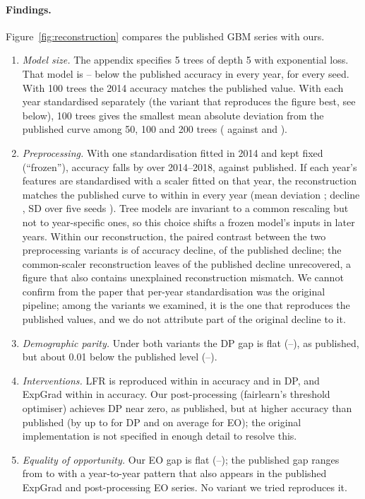 \documentclass[10pt]{article}
\begin{document}
\paragraph{Findings.}
Figure~\ref{fig:reconstruction} compares the published GBM series with ours.
\begin{enumerate}
\item \emph{Model size.} The appendix specifies 5 trees of depth 5 with exponential loss. That model is \LiteralAccGapMin--\LiteralAccGapMax{} below the published accuracy in every year, for every seed. With 100 trees the 2014 accuracy matches the published value. With each year standardised separately (the variant that reproduces the figure best, see below), 100 trees gives the smallest mean absolute deviation from the published curve among 50, 100 and 200 trees (\AccMeanDevTreesCPerYear{} against \AccMeanDevTreesLPerYear{} and \AccMeanDevTreesCCPerYear{}).
\item \emph{Preprocessing.} With one standardisation fitted in 2014 and kept fixed (``frozen''), accuracy falls by \AccDeclineCommon{} over 2014--2018, against \PubAccDecline{} published. If each year's features are standardised with a scaler fitted on that year, the reconstruction matches the published curve to within \AccMaxDevPerYear{} in every year (mean deviation \AccMeanDevPerYear{}; decline \AccDeclinePerYear{}, SD over five seeds \AccDeclineSDPerYear{}). Tree models are invariant to a common rescaling but not to year-specific ones, so this choice shifts a frozen model's inputs in later years. Within our reconstruction, the paired contrast between the two preprocessing variants is \PreprocContrastAcc{} of accuracy decline, \PreprocContrastShare{} of the published decline; the common-scaler reconstruction leaves \ShareNotRecoveredCommon{} of the published decline unrecovered, a figure that also contains unexplained reconstruction mismatch. We cannot confirm from the paper that per-year standardisation was the original pipeline; among the variants we examined, it is the one that reproduces the published values, and we do not attribute part of the original decline to it.
\item \emph{Demographic parity.} Under both variants the DP gap is flat (\DPMinPerYear--\DPMaxPerYear{}), as published, but about 0.01 below the published level (\PubDPMin--\PubDPMax).
\item \emph{Interventions.} LFR is reproduced within \LFRAccMaxDevPerYear{} in accuracy and \LFRDPMaxDevPerYear{} in DP, and ExpGrad within \ExpGradAccMaxDevPerYear{} in accuracy. Our post-processing (fairlearn's threshold optimiser) achieves DP near zero, as published, but at higher accuracy than published (by up to \PostAccMaxDevPerYear{} for DP and \PostEOAccGap{} on average for EO); the original implementation is not specified in enough detail to resolve this.
\item \emph{Equality of opportunity.} Our EO gap is flat (\EOMinPerYear--\EOMaxPerYear); the published gap ranges from \PubEOMin{} to \PubEOMax{} with a year-to-year pattern that also appears in the published ExpGrad and post-processing EO series. No variant we tried reproduces it.
\end{enumerate}
\end{document}
